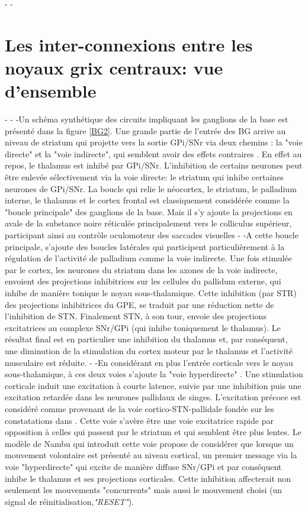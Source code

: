 -
-\section{Les inter-connexions entre les noyaux grix centraux: vue d'ensemble }
-
-
-Un schéma synthétique des circuits impliquant les ganglions de la base est présenté dans la figure \ref{BG2}. Une grande partie de l'entrée des BG arrive au niveau de striatum qui projette vers la sortie GPi/SNr via deux chemins : la "voie directe" et la "voie indirecte", qui semblent avoir des effets contraires \citep{Albin:1989}. En effet au repos, le thalamus est inhibé par GPi/SNr. L'inhibition de certains neurones peut être enlevée sélectivement via la voie directe: le striatum qui inhibe certaines neurones de GPi/SNr. La boucle qui relie le néocortex, le striatum, le palladium interne, le thalamus et le cortex frontal est classiquement considérée comme la "boucle principale" des ganglions de la base. Mais il s'y ajoute la projections en avale de la substance noire réticulée principalement vers le colliculus supérieur, participant ainsi au contrôle oculomoteur des saccades visuelles \citep{Graybiel:1978, Hikosaka:1983a, Hikosaka:1983b, Hikosaka:1983c}
-
-A cette boucle principale, s'ajoute des boucles latérales qui participent particulièrement à la régulation de l'activité de palladium comme la voie indirecte. Une fois stimulée par le cortex, les neurones du striatum dans les axones de la voie indirecte, envoient des projections inhibitrices sur les cellules du pallidum externe, qui inhibe de manière tonique le noyau sous-thalamique. Cette inhibition (par STR) des projections inhibitrices du GPE, se traduit par une réduction nette de l'inhibition de STN. Finalement STN, à son tour, envoie des projections excitatrices au complexe SNr/GPi (qui inhibe toniquement le thalamus). Le résultat final est en particulier une inhibition du thalamus et, par conséquent, une diminution de la stimulation du cortex moteur par le thalamus et l'activité musculaire est réduite.
-
-En considérant en plus l'entrée corticale vers le noyau sous-thalamique, à ces deux voies s'ajoute la "voie hyperdirecte" \citep{Nambu:2002, Joel:1997}. Une stimulation corticale induit une excitation à courte latence, suivie par une inhibition puis une excitation retardée dans les neurones pallidaux de singes. L'excitation précoce est considéré comme provenant de la voie cortico-STN-pallidale fondée sur les constatations dans \citep{Nambu:2000}. Cette voie s'avère être une voie excitatrice rapide par opposition à celles qui passent par le striatum et qui semblent être plus lentes. Le modèle de Nambu qui introduit cette voie propose de considérer que lorsque un mouvement volontaire est présenté au niveau cortical, un premier message via la voie "hyperdirecte" qui excite de manière diffuse SNr/GPi et par conséquent inhibe le thalamus et ses projections corticales. Cette inhibition affecterait non seulement les mouvements "concurrents" mais aussi le mouvement choisi (un signal de réinitialisation,\textit{"RESET"}).
